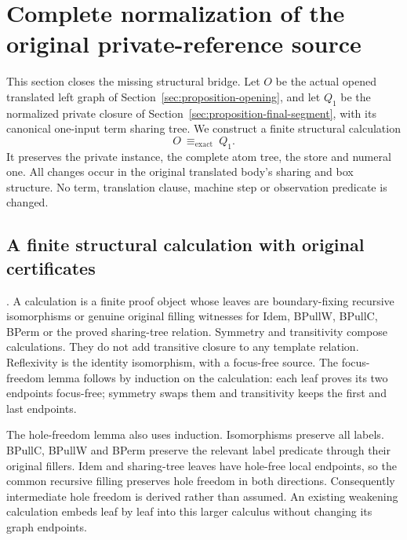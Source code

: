 \clearpage
\section{Complete normalization of the original private-reference source}
\label{sec:proposition-source-normalization}
This section closes the missing structural bridge. Let $O$ be the actual
opened translated left graph of Section~\ref{sec:proposition-opening},
and let $Q_1$ be the normalized private closure of
Section~\ref{sec:proposition-final-segment}, with its canonical one-input
term sharing tree. We construct a finite structural calculation
\[
 O\ \equiv_{\mathrm{exact}}\ Q_1.
\]
It preserves the private instance, the complete atom tree, the store and
numeral one. All changes occur in the original translated body's sharing
and box structure. No term, translation clause, machine step or observation
predicate is changed.

\subsection{A finite structural calculation with original certificates}
.
A calculation is a finite proof object whose leaves are boundary-fixing
recursive isomorphisms or genuine original filling witnesses for Idem,
BPullW, BPullC, BPerm or the proved sharing-tree relation. Symmetry and
transitivity compose calculations. They do not add transitive closure to
any template relation. Reflexivity is the identity isomorphism, with a
focus-free source. The focus-freedom lemma follows by induction on the
calculation: each leaf proves its two endpoints focus-free; symmetry swaps
them and transitivity keeps the first and last endpoints.

The hole-freedom lemma also uses induction. Isomorphisms preserve all labels.
BPullC, BPullW and BPerm preserve the relevant label predicate through their
original fillers. Idem and sharing-tree leaves have hole-free local endpoints,
so the common recursive filling preserves hole freedom in both directions.
Consequently intermediate hole freedom is derived rather than assumed.
An existing weakening calculation embeds leaf by leaf into this larger
calculus without changing its graph endpoints.

